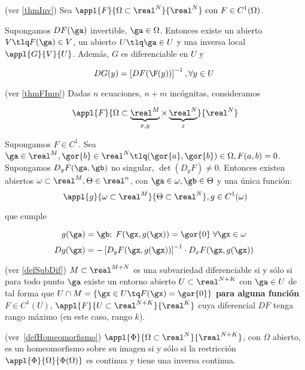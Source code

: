 \begin{theorem}  (ver \ref{thmInv})
Sea $\appl{F}{\Omega\subset\real^N}{\real^N} \text{ con } F\in C^1(\Omega)$.

Supongamos $DF(\ga)$ invertible, $\ga \in \Omega$. Entonces existe un abierto $V \tlq F(\ga)\in V$, un abierto $U \tlq \ga \in U$ y una inversa local $\appl{G}{V}{U}$. Además, $G$ es diferenciable en $U$ y 

\[ DG(y) = \left[DF(\F(y))\right]^{-1}, \forall y \in U \]
\end{theorem}

\begin{theorem} (ver \ref{thmFImp}) Dadas $n$ ecuaciones, $n+m$ incógnitas, consideramos 

$$\appl{F}{\Omega\subset\underbrace{\real^M}_{x,y} \times \underbrace{\real^N}_{z}}{\real^N}$$

Supongamos $F\in C^1$. Sea $\ga \in \real^M, \gor{b} \in \real^N \tlq (\gor{a},\gor{b})\in \Omega , F(a,b)=0$. Supongamos $D_yF(\ga,\gb)$ no singular, $\det(D_yF)\neq 0$. Entonces existen abiertos $\omega \subset \real^M, \Theta \in\real^n$, con $\ga \in \omega, \gb \in \Theta$ y una única función: \[ \appl{g}{\omega\subset\real^M}{\Theta \subset\real^N}, g\in C^1(\omega) \]

que cumple

\[ g(\ga) = \gb;\; F(\gx,g(\gx)) = \gor{0}\; \forall \gx \in \omega \]
\[ Dg(\gx) = - \left[D_yF(\gx,g(\gx))\right]^{-1} \cdot D_xF(\gx,g(\gx)) \]
\end{theorem}

 \begin{defn}(ver \ref{defSubDif}) $M \subset \real^{M+N}$ es una subvariedad diferenciable si y sólo si para todo punto $\ga$ existe un entorno abierto $U \subset \real^{N+K}$ con $\ga \in U$ de tal forma que $U \cap M = \{\gx\in U\tq F(\gx) = \gor{0}\}$ \textbf{para alguna función} $F\in C^1(U)$, $\appl{F}{U\subset \real^{N+K}}{\real^K}$ cuya diferencial $DF$ tenga rango máximo (en este caso, rango $k$).
  \end{defn}
  
  \begin{defn}[Homeomorfismo][] (ver \ref{defHomeomorfismo}) $\appl{\Phi}{\Omega\subset\real^N}{\real^{N+K}}$, con $\Omega$ abierto, es un homeomorfismo sobre su imagen si y sólo si la restricción $\appl{\Phi}{\Omega}{\Phi(\Omega)}$ es continua y tiene una inversa continua.
  \end{defn}
  
